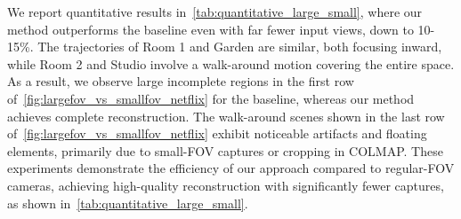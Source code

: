 

We report quantitative results in~\cref{tab:quantitative_large_small}, where our method outperforms the baseline even with far fewer input views, down to 10-15\%. 
The trajectories of Room 1 and Garden are similar, both focusing inward, while Room 2 and Studio involve a walk-around motion covering the entire space. As a result, we observe large incomplete regions in the first row of~\cref{fig:largefov_vs_smallfov_netflix} for the baseline, whereas our method achieves complete reconstruction. The walk-around scenes shown in the last row of~\cref{fig:largefov_vs_smallfov_netflix} exhibit noticeable artifacts and floating elements, primarily due to small-FOV captures or cropping in COLMAP.
These experiments demonstrate the efficiency of our approach compared to regular-FOV cameras, achieving high-quality reconstruction with significantly fewer captures, as shown in~\cref{tab:quantitative_large_small}.

\begin{table}[t]
  \centering
  \caption{\textbf{Ablations of Hybrid Field.} We conduct ablation studies on our full method, including an explicit grid initialized with COLMAP's traditional polynomial distortion parameters, to demonstrate the necessity of adopting a hybrid neural distortion field representation in FisheyeNeRF~\cite{jeong2021self}. In the results, ``-'' indicates cases that are computationally infeasible to evaluate.}
  \label{tab:ablation_hybrid}
\end{table}



